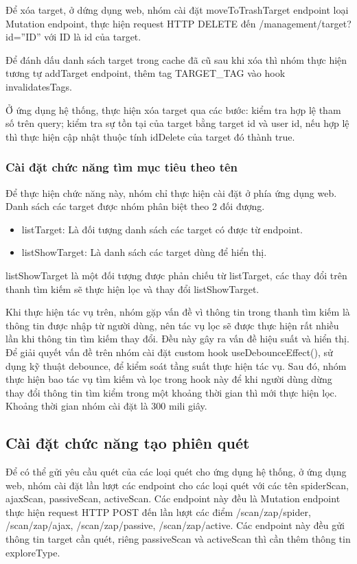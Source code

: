 Để xóa target, ở dứng dụng web, nhóm cài đặt moveToTrashTarget endpoint loại Mutation endpoint, thực hiện request HTTP DELETE đến /management/target?id=”ID” với ID là id của target.

Để đánh dấu danh sách target trong cache đã cũ sau khi xóa thì nhóm thực hiện tương tự addTarget endpoint, thêm tag TARGET\_TAG vào hook invalidatesTags.

Ở ứng dụng hệ thống, thực hiện xóa target qua các bước: kiểm tra hợp lệ tham số trên query; kiểm tra sự tồn tại của target bằng target id và user id, nếu hợp lệ thì thực hiện cập nhật thuộc tính idDelete của target đó thành true.

\subsubsection{Cài đặt chức năng tìm mục tiêu theo tên}

\tab Để thực hiện chức năng này, nhóm chỉ thực hiện cài đặt ở phía ứng dụng web. Danh sách các target được nhóm phân biệt theo 2 đối đượng.

\begin{itemize}
  \item listTarget: Là đối tượng danh sách các target có được từ endpoint.
  \item listShowTarget: Là danh sách các target dùng để hiển thị.
\end{itemize}

listShowTarget là một đối tượng được phản chiếu từ listTarget, các thay đổi trên thanh tìm kiếm sẽ thực hiện lọc và thay đổi listShowTarget.

Khi thực hiện tác vụ trên, nhóm gặp vấn đề vì thông tin trong thanh tìm kiếm là thông tin được nhập từ người dùng, nên tác vụ lọc sẽ được thực hiện rất nhiều lần khi thông tin tìm kiếm thay đổi. Đều này gây ra vấn đề hiệu suất và hiển thị. Để giải quyết vấn đề trên nhóm cài đặt custom hook useDebounceEffect(), sử dụng kỹ thuật debounce, để kiểm soát tầng suất thực hiện tác vụ. Sau đó, nhóm thực hiện bao tác vụ tìm kiếm và lọc trong hook này để khi người dùng dừng thay đổi thông tin tìm kiểm trong một khoảng thời gian thì mới thực hiện lọc. Khoảng thời gian nhóm cài đặt là 300 mili giây.

\subsection{Cài đặt chức năng tạo phiên quét}

\tab Để có thể gửi yêu cầu quét của các loại quét cho ứng dụng hệ thống, ở ứng dụng web, nhóm cài đặt lần lượt các endpoint cho các loại quét với các tên spiderScan, ajaxScan, passiveScan, activeScan. Các endpoint này đều là Mutation endpoint thực hiện request HTTP POST đến lần lượt các điểm /scan/zap/spider, /scan/zap/ajax, /scan/zap/passive, /scan/zap/active. Các endpoint này đều gửi thông tin target cần quét, riêng passiveScan và activeScan thì cần thêm thông tin exploreType.

